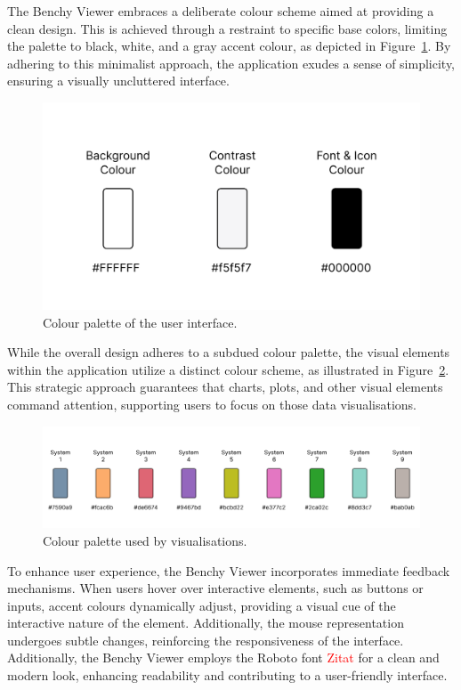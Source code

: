 The Benchy Viewer embraces a deliberate colour scheme aimed at providing a clean design. This is achieved through a restraint to specific base colors, limiting the palette to black, white, and a gray accent colour, as depicted in Figure~\ref{fig:colors}. By adhering to this minimalist approach, the application exudes a sense of simplicity, ensuring a visually uncluttered interface.



\begin{figure}[h]
  \centering
  \includegraphics[width=0.5\linewidth]{figures/colors.png}
  \caption{Colour palette of the user interface.}
  \label{fig:colors}
\end{figure}

While the overall design adheres to a subdued colour palette, the visual elements within the application utilize a distinct colour scheme, as illustrated in Figure~\ref{fig:colors-dbms}. This strategic approach guarantees that charts, plots, and other visual elements command attention, supporting users to focus on those data visualisations.

\begin{figure}[h]
  \centering
  \includegraphics[width=1\linewidth]{figures/colors-dbms.png}
  \caption{Colour palette used by visualisations.}
  \label{fig:colors-dbms}
\end{figure}

To enhance user experience, the Benchy Viewer incorporates immediate feedback mechanisms. When users hover over interactive elements, such as buttons or inputs, accent colours dynamically adjust, providing a visual cue of the interactive nature of the element. Additionally, the mouse representation undergoes subtle changes, reinforcing the responsiveness of the interface.\\
Additionally, the Benchy Viewer employs the Roboto font \textcolor{red}{Zitat} for a clean and modern look, enhancing readability and contributing to a user-friendly interface.


